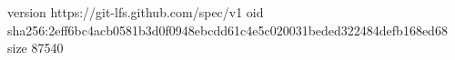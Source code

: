 version https://git-lfs.github.com/spec/v1
oid sha256:2eff6bc4acb0581b3d0f0948ebcdd61c4e5c020031beded322484defb168ed68
size 87540
